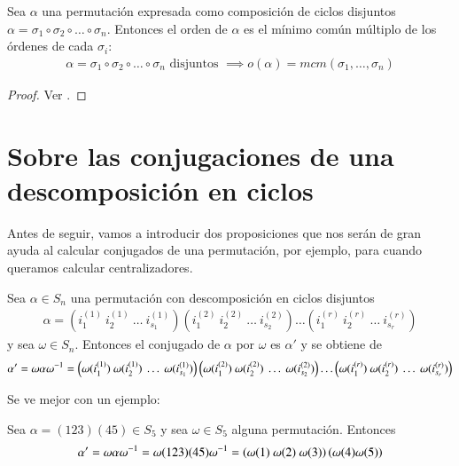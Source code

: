 \begin{thm}
	Sea $\alpha$ una permutación expresada como composición de ciclos disjuntos $\alpha = \sigma_1 \circ \sigma_2 \circ \dots \circ \sigma_n$. Entonces el orden de $\alpha$ es el mínimo común múltiplo de los órdenes de cada $\sigma_i$:
	\begin{align*}
		\alpha = \sigma_1 \circ \sigma_2 \circ \dots \circ \sigma_n \text{ disjuntos } \implies o(\alpha) = mcm(\sigma_1, \dots, \sigma_n)
	\end{align*}
\end{thm}


\begin{proof}
	Ver \cite[p.~120]{dor96}.
\end{proof}

\section{Sobre las conjugaciones de una descomposición en ciclos}

Antes de seguir, vamos a introducir dos proposiciones que nos serán de gran ayuda al calcular conjugados de una permutación, por ejemplo, para cuando queramos calcular centralizadores.

\begin{pro}
	Sea $\alpha \in S_n$ una permutación con descomposición en ciclos disjuntos
	\begin{align*}
	\alpha = \left(i_1^{(1)}\ i_2^{(1)}\ \dots\ i_{s_1}^{(1)}\right)\left(i_1^{(2)}\ i_2^{(2)}\ \dots\ i_{s_2}^{(2)}\right)\dots\left(i_1^{(r)}\ i_2^{(r)}\ \dots\ i_{s_r}^{(r)}\right)
	\end{align*}
	y sea $\omega \in S_n$. Entonces el conjugado de $\alpha$ por $\omega$ es $\alpha'$ y se obtiene de
	\begin{align*}
	\alpha' = \omega \alpha \inv{\omega} = \left(\omega(i_1^{(1)})\ \omega(i_2^{(1)})\ \dots\ \omega(i_{s_1}^{(1)})\right)\left(\omega(i_1^{(2)})\ \omega(i_2^{(2)})\ \dots\ \omega(i_{s_2}^{(2)})\right)\dots\left(\omega(i_1^{(r)})\ \omega(i_2^{(r)})\ \dots\ \omega(i_{s_r}^{(r)})\right)
	\end{align*}
\end{pro}

Se ve mejor con un ejemplo:

\begin{ej}
	Sea $\alpha = (123)(45) \in S_5$ y sea $\omega \in S_5$ alguna permutación. Entonces
	\begin{align*}
	\alpha' = \omega\alpha\omega^{-1} = \omega(123)(45)\omega^{-1}= \left(\omega(1)\ \omega(2)\ \omega(3)\right)\left(\omega(4) \omega(5)\right)
	\end{align*}
\end{ej}

